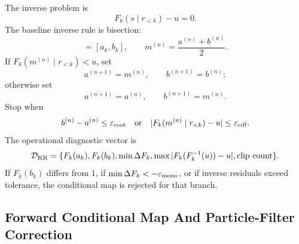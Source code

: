 \documentclass[11pt]{article}
\numberwithin{equation}{section}
\begin{document}
The inverse problem is
\begin{equation}
    F_k(s\mid r_{<k})-u=0.
    \label{eq:p24-p23-krops5}
\end{equation}
The baseline inverse rule is bisection:
\begin{equation}
    [a^{(0)},b^{(0)}]=[a_k,b_k],
    \qquad
    m^{(n)}=\frac{a^{(n)}+b^{(n)}}2.
    \label{eq:p24-p23-krops6}
\end{equation}
If \(F_k(m^{(n)}\mid r_{<k})<u\), set
\begin{equation}
    a^{(n+1)}=m^{(n)},\qquad b^{(n+1)}=b^{(n)};
    \label{eq:p24-p23-krops7}
\end{equation}
otherwise set
\begin{equation}
    a^{(n+1)}=a^{(n)},\qquad b^{(n+1)}=m^{(n)}.
    \label{eq:p24-p23-krops8}
\end{equation}
Stop when
\begin{equation}
    b^{(n)}-a^{(n)}\le \varepsilon_{\rm root}
    \quad\text{or}\quad
    |F_k(m^{(n)}\mid r_{<k})-u|\le \varepsilon_{\rm cdf}.
    \label{eq:p24-p23-krops9}
\end{equation}
The operational diagnostic vector is
\begin{equation}
    \mathcal D_{\rm KR}
    =
    \{F_k(a_k),F_k(b_k),\min\Delta F_k,
      \max|F_k(F_k^{-1}(u))-u|,\text{clip count}\}.
    \label{eq:p24-p23-krops10}
\end{equation}
If \(F_k(b_k)\) differs from \(1\), if \(\min\Delta F_k<-\varepsilon_{\rm mono}\),
or if inverse residuals exceed tolerance, the conditional map is rejected for
that branch.

\begin{center}
\end{center}

\subsection{Forward Conditional Map And Particle-Filter Correction}
\end{document}
